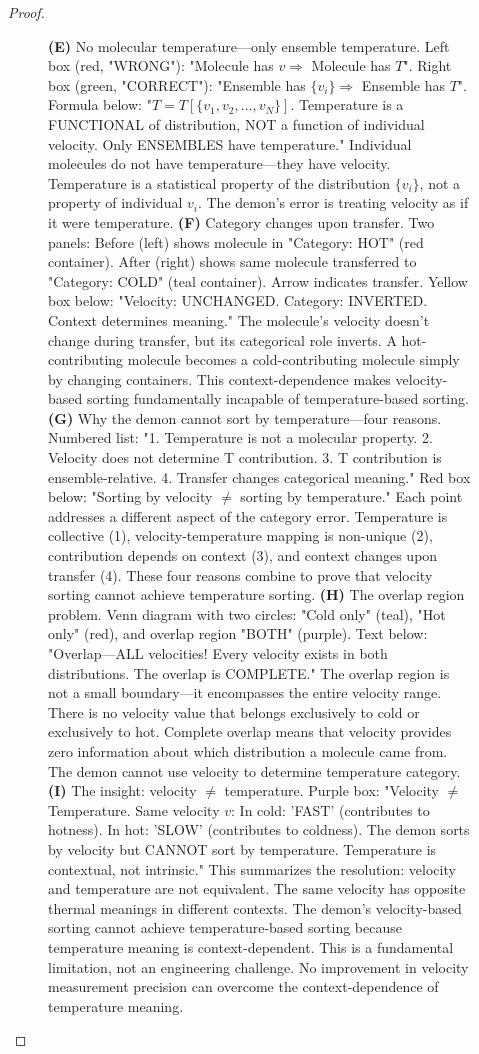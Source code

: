 \documentclass[12pt,a4paper]{article}
\theoremstyle{definition}
\theoremstyle{remark}
\begin{document}
\begin{proof}
\begin{figure}[htbp]
{\textbf{(E)} No molecular temperature—only ensemble temperature. Left box (red, "WRONG"): "Molecule has $v \Rightarrow$ Molecule has $T$". Right box (green, "CORRECT"): "Ensemble has $\{v_i\} \Rightarrow$ Ensemble has $T$". Formula below: "$T = T[\{v_1, v_2, \ldots, v_N\}]$. Temperature is a FUNCTIONAL of distribution, NOT a function of individual velocity. Only ENSEMBLES have temperature." Individual molecules do not have temperature—they have velocity. Temperature is a statistical property of the distribution $\{v_i\}$, not a property of individual $v_i$. The demon's error is treating velocity as if it were temperature.
\textbf{(F)} Category changes upon transfer. Two panels: Before (left) shows molecule in "Category: HOT" (red container). After (right) shows same molecule transferred to "Category: COLD" (teal container). Arrow indicates transfer. Yellow box below: "Velocity: UNCHANGED. Category: INVERTED. Context determines meaning." The molecule's velocity doesn't change during transfer, but its categorical role inverts. A hot-contributing molecule becomes a cold-contributing molecule simply by changing containers. This context-dependence makes velocity-based sorting fundamentally incapable of temperature-based sorting.
\textbf{(G)} Why the demon cannot sort by temperature—four reasons. Numbered list: "1. Temperature is not a molecular property. 2. Velocity does not determine T contribution. 3. T contribution is ensemble-relative. 4. Transfer changes categorical meaning." Red box below: "Sorting by velocity $\neq$ sorting by temperature." Each point addresses a different aspect of the category error. Temperature is collective (1), velocity-temperature mapping is non-unique (2), contribution depends on context (3), and context changes upon transfer (4). These four reasons combine to prove that velocity sorting cannot achieve temperature sorting.
\textbf{(H)} The overlap region problem. Venn diagram with two circles: "Cold only" (teal), "Hot only" (red), and overlap region "BOTH" (purple). Text below: "Overlap—ALL velocities! Every velocity exists in both distributions. The overlap is COMPLETE." The overlap region is not a small boundary—it encompasses the entire velocity range. There is no velocity value that belongs exclusively to cold or exclusively to hot. Complete overlap means that velocity provides zero information about which distribution a molecule came from. The demon cannot use velocity to determine temperature category.
\textbf{(I)} The insight: velocity $\neq$ temperature. Purple box: "Velocity $\neq$ Temperature. Same velocity $v$: In cold: 'FAST' (contributes to hotness). In hot: 'SLOW' (contributes to coldness). The demon sorts by velocity but CANNOT sort by temperature. Temperature is contextual, not intrinsic." This summarizes the resolution: velocity and temperature are not equivalent. The same velocity has opposite thermal meanings in different contexts. The demon's velocity-based sorting cannot achieve temperature-based sorting because temperature meaning is context-dependent. This is a fundamental limitation, not an engineering challenge. No improvement in velocity measurement precision can overcome the context-dependence of temperature meaning.}

\end{figure}
\end{proof}
\end{document}
